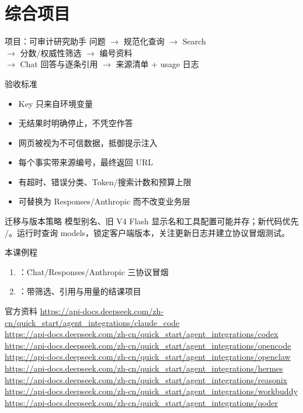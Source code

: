 \documentclass[aspectratio=169,UTF8]{ctexbeamer}
\begin{document}
\section{综合项目}
\begin{frame}{项目：可审计研究助手}
\centering
问题 $\rightarrow$ 规范化查询 $\rightarrow$ Search\\
$\rightarrow$ 分数/权威性筛选 $\rightarrow$ 编号资料\\
$\rightarrow$ Chat 回答与逐条引用 $\rightarrow$ 来源清单 + usage 日志
\end{frame}
\begin{frame}{验收标准}
\begin{itemize}
  \item Key 只来自环境变量
  \item 无结果时明确停止，不凭空作答
  \item 网页被视为不可信数据，抵御提示注入
  \item 每个事实带来源编号，最终返回 URL
  \item 有超时、错误分类、Token/搜索计数和预算上限
  \item 可替换为 Responses/Anthropic 而不改变业务层
\end{itemize}
\end{frame}
\begin{frame}{迁移与版本策略}
模型别名、旧 V4 Flash 显示名和工具配置可能并存；新代码优先 /。运行时查询 models，锁定客户端版本，关注更新日志并建立协议冒烟测试。
\end{frame}
\begin{frame}{本课例程}
\begin{enumerate}
  \item {}：Chat/Responses/Anthropic 三协议冒烟
  \item {}：带筛选、引用与用量的结课项目
\end{enumerate}
\end{frame}
\begin{frame}{官方资料}
\scriptsize
\url{https://api-docs.deepseek.com/zh-cn/quick_start/agent_integrations/claude_code}\\
\url{https://api-docs.deepseek.com/zh-cn/quick_start/agent_integrations/codex}\\
\url{https://api-docs.deepseek.com/zh-cn/quick_start/agent_integrations/opencode}\\
\url{https://api-docs.deepseek.com/zh-cn/quick_start/agent_integrations/openclaw}\\
\url{https://api-docs.deepseek.com/zh-cn/quick_start/agent_integrations/hermes}\\
\url{https://api-docs.deepseek.com/zh-cn/quick_start/agent_integrations/reasonix}\\
\url{https://api-docs.deepseek.com/zh-cn/quick_start/agent_integrations/workbuddy}\\
\url{https://api-docs.deepseek.com/zh-cn/quick_start/agent_integrations/qoder}
\end{frame}
\end{document}
